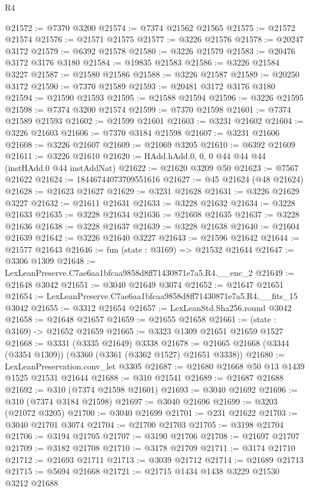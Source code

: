 \begin{lexlean}{R4}
\begin{coremodule}
@21572 := @7370 @3200
@21574 := @7374 @21562 @21565
@21575 := @21572 @21574
@21576 := @21571 @21575
@21577 := @3226 @21576
@21578 := @20247 @3172
@21579 := @6392 @21578
@21580 := @3226 @21579
@21583 := @20476 @3172 @3176 @3180
@21584 := @19835 @21583
@21586 := @3226 @21584 @3227
@21587 := @21580 @21586
@21588 := @3226 @21587
@21589 := @20250 @3172
@21590 := @7370 @21589
@21593 := @20481 @3172 @3176 @3180
@21594 := @21590 @21593
@21595 := @21588 @21594
@21596 := @3226 @21595
@21598 := @7374 @3200 @21574
@21599 := @7370 @21598
@21601 := @7374 @21589 @21593
@21602 := @21599 @21601
@21603 := @3231 @21602
@21604 := @3226 @21603
@21606 := @7370 @3184 @21598
@21607 := @3231 @21606
@21608 := @3226 @21607
@21609 := @21069 @3205
@21610 := @6392 @21609
@21611 := @3226 @21610
@21620 := HAdd.hAdd.{0, 0, 0} @44 @44 @44 (instHAdd.{0} @44 instAddNat)
@21622 := @21620 @3209 @50
@21623 := @7567 @21622
@21624 := 18446744073709551616
@21627 := @45 @21624 (@48 @21624)
@21628 := @21623 @21627
@21629 := @3231 @21628
@21631 := @3226 @21629 @3227
@21632 := @21611 @21631
@21633 := @3228 @21632
@21634 := @3228 @21633
@21635 := @3228 @21634
@21636 := @21608 @21635
@21637 := @3228 @21636
@21638 := @3228 @21637
@21639 := @3228 @21638
@21640 := @21604 @21639
@21642 := @3226 @21640 @3227
@21643 := @21596 @21642
@21644 := @21577 @21643
@21646 := fun (state : @3169) => @21532 @21644
@21647 := @3306 @1309
@21648 := LexLeanPreserve.C7ae6aa1bfcaa9858d8ff71430871e7a5.R4.__enc_2
@21649 := @21648 @3042
@21651 := @3040 @21649 @3074
@21652 := @21647 @21651
@21654 := LexLeanPreserve.C7ae6aa1bfcaa9858d8ff71430871e7a5.R4.__fits_15 @3042
@21655 := @3312 @21654
@21657 := LexLeanStd.Sha256.round @3042
@21658 := @21648 @21657
@21659 := @21655 @21658
@21661 := (state : @3169) -> @21652 @21659
@21665 := @3323 @1309 @21651 @21659 @1527
@21668 := @3331 (@3335 @21649) @3338
@21678 := @21665 @21668 (@3344 (@3354 @1309)) (@3360 (@3361 (@3362 @1527) @21651 @3338))
@21680 := LexLeanPreservation.conv_let @3305
@21687 := @21680 @21668 @50 @13 @1439 @1525 @21531 @21644
@21688 := @310 @21541
@21689 := @21687 @21688
@21692 := @310 (@7374 @21598 @21601)
@21693 := @3040 @21692
@21696 := @310 (@7374 @3184 @21598)
@21697 := @3040 @21696
@21699 := @3203 (@21072 @3205)
@21700 := @3040 @21699
@21701 := @231 @21622
@21703 := @3040 @21701 @3074
@21704 := @21700 @21703
@21705 := @3198 @21704
@21706 := @3194 @21705
@21707 := @3190 @21706
@21708 := @21697 @21707
@21709 := @3182 @21708
@21710 := @3178 @21709
@21711 := @3174 @21710
@21712 := @21693 @21711
@21713 := @3039 @21712
@21714 := @21689 @21713
@21715 := @5694 @21668
@21721 := @21715 @1434 @1438 @3229 @21530 @3212 @21688

\end{coremodule}
\end{lexlean}
